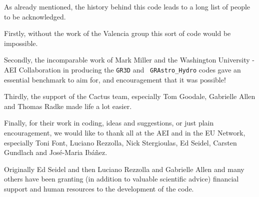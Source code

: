 \documentclass{article}
\begin{document}
As already mentioned, the history behind this code leads to a long list
of people to be acknowledged.

Firstly, without the work of the Valencia group this sort of code
would be impossible. 

Secondly, the incomparable work of Mark Miller and the Washington
University - AEI Collaboration in producing the {\tt GR3D} and {\tt
GRAstro\_Hydro} codes gave an essential benchmark to aim for, and
encouragement that it was possible!

Thirdly, the support of the Cactus team, especially Tom Goodale,
Gabrielle Allen and Thomas Radke made life a
lot easier.

Finally, for their work in coding, ideas and suggestions, or just
plain encouragement, we would like to thank all at the AEI and in the
EU Network, especially Toni Font, Luciano Rezzolla, Nick Stergioulas,
Ed Seidel, Carsten Gundlach and Jos\'e-Maria Ib{\'a}{\~n}ez.

Originally Ed Seidel and then Luciano Rezzolla and Gabrielle Allen and many others 
have been granting (in addition to valuable
scientific advice) financial support and human resources to the development of the code.
\end{document}
